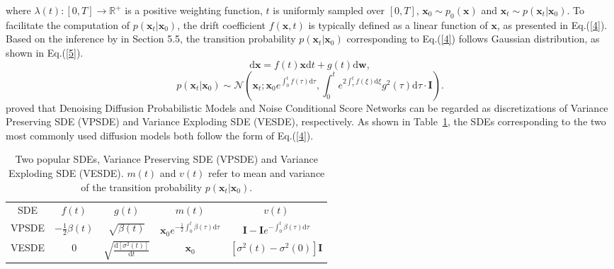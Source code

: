 where $\lambda(t):[0,T]\rightarrow\mathbb{R}^+$ is a positive weighting function, $t$ is uniformly sampled over $[0,T]$, $\boldsymbol{x}_0\sim p_0(\boldsymbol{x})$ and $\boldsymbol{x}_t\sim p(\boldsymbol{x}_t|\boldsymbol{x}_0)$. To facilitate the computation of $p(\boldsymbol{x}_t|\boldsymbol{x}_0)$, the drift coefficient $f(\boldsymbol{x},t)$ is typically defined as a linear function of $\boldsymbol{x}$, as presented in Eq.(\ref{4}). Based on the inference by \cite{sarkka2019applied} in Section 5.5, the transition probability $p(\boldsymbol{x}_t|\boldsymbol{x}_0)$ corresponding to Eq.(\ref{4}) follows Gaussian distribution, as shown in Eq.(\ref{5}).
\begin{equation}
    \mathrm{d}\boldsymbol{x}=f(t)\boldsymbol{x}\mathrm{d}t + g(t) \mathrm{d}\boldsymbol{w}, \label{4}
\end{equation}
\begin{equation}
    p(\boldsymbol{x}_t|\boldsymbol{x}_0)\sim\mathcal{N}\left(\boldsymbol{x}_t;\boldsymbol{x}_0e^{\int_0^tf(\tau)\mathrm{d}\tau},\int_0^te^{2\int_\tau^t f(\xi)\mathrm{d}\xi}g^2(\tau)\mathrm{d}\tau\cdot\boldsymbol{I} \right). \label{5}
\end{equation}
\cite{song2020sde} proved that Denoising Diffusion Probabilistic Models \citep{ho2020ddpm} and Noise Conditional
Score Networks \citep{song2019ncsn} can be regarded as discretizations of Variance Preserving SDE (VPSDE) and Variance Exploding SDE (VESDE), respectively. As shown in Table~\ref{table1}, the SDEs corresponding to the two most commonly used diffusion models both follow the form of Eq.(\ref{4}).

\renewcommand{\arraystretch}{1.5}
\begin{table}[hb]
\caption{Two popular SDEs, Variance Preserving SDE (VPSDE) and Variance Exploding SDE (VESDE). $m(t)$ and $v(t)$ refer to mean and variance of the transition probability $p(\boldsymbol{x}_t|\boldsymbol{x}_0)$.}
\vspace{-10pt}
\label{table1}
\begin{center}
\begin{tabular}{ccccc}
\toprule[1pt]
SDE & $f(t)$ & $g(t)$ & $m(t)$ & $v(t)$\\
\cmidrule(lr){1-5}
VPSDE\citep{ho2020ddpm}     &$-\frac12\beta(t)$ &$\sqrt{\beta(t)}$   &$\boldsymbol{x}_0e^{-\frac12\int_0^t\beta(\tau)\mathrm{d}\tau}$   &$\boldsymbol{I}-\boldsymbol{I}e^{-\int_0^t\beta(\tau)\mathrm{d}\tau}$\\

VESDE\citep{song2019ncsn}   &$0$                &$\sqrt{\frac{\mathrm{d}[\sigma^{2}(t)]}{\mathrm{d}t}}$     &$\boldsymbol{x}_0$     &$\left[\sigma^2(t)-\sigma^2(0)\right]\boldsymbol{I}$\\
\bottomrule[1pt]
\end{tabular}
\end{center}
\end{table}

